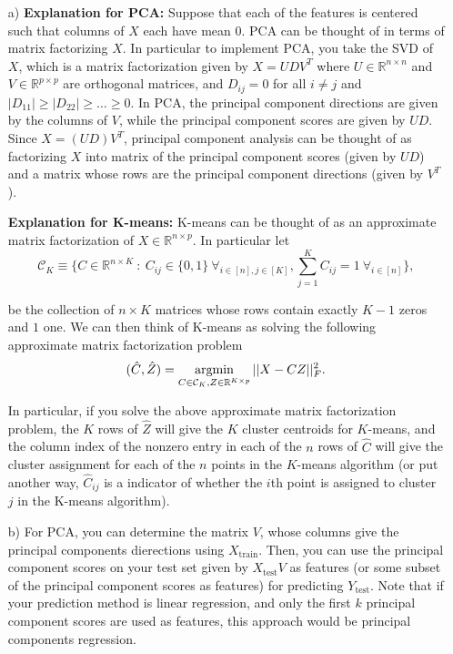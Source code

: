 \begin{enumerate}

\item[a)] 
\textbf{Explanation for PCA:} Suppose that each of the features is centered such that columns of $X$ each have mean $0$. PCA can be thought of in terms of matrix factorizing $X$. In particular to implement PCA, you take the SVD of $X$, which is a matrix factorization given by $X=UDV^T$ where $U \in \mathbb{R}^{n \times n}$ and $V \in \mathbb{R}^{p \times p}$ are orthogonal matrices, and $D_{ij} = 0$ for all $i \neq j$ and $\vert D_{11} \vert \geq \vert D_{22} \vert \geq \dots \geq 0$. In PCA, the principal component directions are given by the columns of $V$, while the principal component scores are given by $UD$. Since $X=(UD) V^T$, principal component analysis can be thought of as factorizing $X$ into matrix of the principal component scores (given by $UD$) and a matrix whose rows are the principal component directions (given by $V^T$).

\textbf{Explanation for K-means:} K-means can be thought of as an approximate matrix factorization of $X \in \mathbb{R}^{n \times p}$. In particular let $$\mathcal{C}_K \equiv \Bigr\{ C \in \mathbb{R}^{n \times K} \ : \ C_{ij} \in \{0,1 \} \ \forall_{i \in [n],j \in [K]}, \sum_{j=1}^{K}C_{ij} =1 \ \forall_{i \in [n] } \Bigr\},$$

be the collection of $n \times K$ matrices whose rows contain exactly $K-1$ zeros and $1$ one. We can then think of K-means as solving the following approximate matrix factorization problem $$(\hat{C}, \hat{Z} ) = \operatorname*{argmin}\limits_{C \in \mathcal{C}_K , Z \in \mathbb{R}^{K \times p} } \vert \vert X - CZ \vert \vert_F^2.$$

In particular, if you solve the above approximate matrix factorization problem, the $K$ rows of $\hat{Z}$ will give the $K$ cluster centroids for $K$-means, and the column index of the nonzero entry in each of the $n$ rows of $\hat{C}$ will give the cluster assignment for each of the $n$ points in the $K$-means algorithm (or put another way, $\hat{C}_{ij}$ is a indicator of whether the $i$th point is assigned to cluster $j$ in the K-means algorithm).

\item[b)] For PCA, you can determine the matrix $V$, whose columns give the principal components dierections using $X_{\text{train}}$. Then, you can use the principal component scores on your test set given by $X_{\text{test}} V$ as features (or some subset of the principal component scores as features) for predicting $Y_{\text{test}}$. Note that if your prediction method is linear regression, and only the first $k$ principal component scores are used as features, this approach would be principal components regression.


\end{enumerate}
